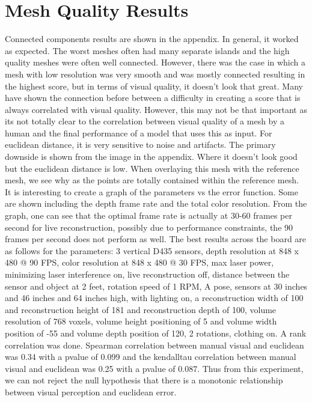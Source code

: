 \section{Mesh Quality Results}
Connected components results are shown in the appendix. In general, it worked as expected. The worst meshes often had many separate islands and the high quality meshes were often well connected. However, there was the case in which a mesh with low resolution was very smooth and was mostly connected resulting in the highest score, but in terms of visual quality, it doesn't look that great. Many have shown the connection before between a difficulty in creating a score that is always correlated with visual quality. However, this may not be that important as its not totally clear to the correlation between visual quality of a mesh by a human and the final performance of a model that uses this as input.
For euclidean distance, it is very sensitive to noise and artifacts. The primary downside is shown from the image in the appendix. Where it doesn't look good but the euclidean distance is low. When overlaying this mesh with the reference mesh, we see why as the points are totally contained within the reference mesh. It is interesting to create a graph of the parameters vs the error function. Some are shown including the depth frame rate and the total color resolution. From the graph, one can see that the optimal frame rate is actually at 30-60 frames per second for live reconstruction, possibly due to performance constraints, the 90 frames per second does not perform as well. The best results across the board are as follows for the parameters: 3 vertical D435 sensors, depth resolution at 848 x 480 @ 90 FPS, color resolution at 848 x 480 @ 30 FPS, max laser power, minimizing laser interference on, live reconstruction off, distance between the sensor and object at 2 feet, rotation speed of 1 RPM, A pose, sensors at 30 inches and 46 inches and 64 inches high, with lighting on, a reconstruction width of 100 and reconstruction height of 181 and reconstruction depth of 100, volume resolution of 768 voxels, volume height positioning of 5 and volume width position of -55 and volume depth position of 120, 2 rotations, clothing on. A rank correlation was done. Spearman correlation between manual visual and euclidean was 0.34 with a pvalue of 0.099 and the kendalltau correlation between manual visual and euclidean was 0.25 with a pvalue of 0.087. Thus from this experiment, we can not reject the null hypothesis that there is a monotonic relationship between visual perception and euclidean error.  
